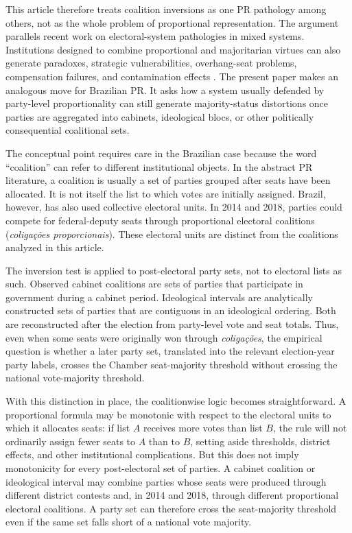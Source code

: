 \documentclass[11pt]{article}
\begin{document}
This article therefore treats coalition inversions as one PR pathology among others, not as the whole problem of proportional representation. The argument parallels recent work on electoral-system pathologies in mixed systems. Institutions designed to combine proportional and majoritarian virtues can also generate paradoxes, strategic vulnerabilities, overhang-seat problems, compensation failures, and contamination effects \parencite{FlisGrofmanKaminski2025Introduction,moon25_parad_mixed_semi_compen_system_south_korea,tanacs-mandak25_hackin_mixed_elect_system,Behnke2025SpectacularEnlargement,flis25_cancel_overh_seats,vucicevic25_legac_past}. The present paper makes an analogous move for Brazilian PR. It asks how a system usually defended by party-level proportionality can still generate majority-status distortions once parties are aggregated into cabinets, ideological blocs, or other politically consequential coalitional sets.


The conceptual point requires care in the Brazilian case because the word
``coalition'' can refer to different institutional objects. In the abstract PR
literature, a coalition is usually a set of parties grouped after seats have been
allocated. It is not itself the list to which votes are initially assigned. Brazil,
however, has also used collective electoral units. In 2014 and 2018, parties
could compete for federal-deputy seats through proportional electoral coalitions
(\emph{coligações proporcionais}). These electoral units are distinct from the coalitions analyzed
in this article.

The inversion test is applied to post-electoral party sets, not to electoral
lists as such. Observed cabinet coalitions are sets of parties that participate
in government during a cabinet period. Ideological intervals are analytically
constructed sets of parties that are contiguous in an ideological ordering. Both
are reconstructed after the election from party-level vote and seat totals.
Thus, even when some seats were originally won through \emph{coligações},
the empirical question is whether a later party set, translated into the
relevant election-year party labels, crosses the Chamber seat-majority threshold
without crossing the national vote-majority threshold.

With this distinction in place, the coalitionwise logic becomes straightforward.
A proportional formula may be monotonic with respect to the electoral units to
which it allocates seats: if list $A$ receives more votes than list $B$, the rule
will not ordinarily assign fewer seats to $A$ than to $B$, setting aside
thresholds, district effects, and other institutional complications. But this
does not imply monotonicity for every post-electoral set of parties. A cabinet
coalition or ideological interval may combine parties whose seats were produced
through different district contests and, in 2014 and 2018, through different
proportional electoral coalitions. A party set can therefore cross the
seat-majority threshold even if the same set falls short of a national vote
majority.
\end{document}

